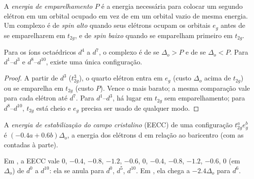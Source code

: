 \begin{definition}\label{def:b2:ligand-field:spin}
A \emph{energia de emparelhamento} $P$ é a energia
necessária para colocar um segundo elétron em um orbital ocupado em vez de em
um orbital vazio de mesma energia. Um complexo é de \emph{spin alto}
quando seus elétrons ocupam os orbitais $e_g$ antes de se emparelharem em
$t_{2g}$, e de \emph{spin baixo} quando se emparelham primeiro em
$t_{2g}$.
\end{definition}

\begin{proposition}\label{prop:b2:ligand-field:spin-state}
Para os íons octaédricos $d^4$ a $d^7$, o complexo é de  se $\Delta_o > P$ e de
 se $\Delta_o < P$. Para $d^1$--$d^3$ e $d^8$--$d^{10}$, existe uma única configuração.
\end{proposition}

\begin{proof}
A partir de $d^3$ ($t_{2g}^3$), o quarto elétron entra em $e_g$ (custo $\Delta_o$ acima de
$t_{2g}$) ou se emparelha em $t_{2g}$ (custo $P$). Vence o mais barato; a mesma
comparação vale para cada elétron até $d^7$. Para $d^1$--$d^3$, há lugar em
$t_{2g}$ sem emparelhamento; para $d^8$--$d^{10}$, $t_{2g}$ está cheio e $e_g$ precisa
ser usado de qualquer modo.
\end{proof}

\begin{definition}\label{def:b2:ligand-field:cfse}
A \emph{energia de estabilização do campo cristalino}
(EECC) de uma configuração $t_{2g}^ae_g^b$ é $(-0.4a + 0.6b)\Delta_o$, a energia
dos elétrons d em relação ao baricentro (com as 
contadas à parte).
\end{definition}

\begin{proposition}\label{prop:b2:ligand-field:cfse}
Em , a EECC vale $0$, $-0.4$, $-0.8$, $-1.2$, $-0.6$, $0$, $-0.4$, $-0.8$, $-1.2$,
$-0.6$, $0$ (em $\Delta_o$) de $d^0$ a $d^{10}$: ela se anula para $d^0$, $d^5$,
$d^{10}$. Em , ela chega a $-2.4\Delta_o$ para $d^6$.
\end{proposition}

